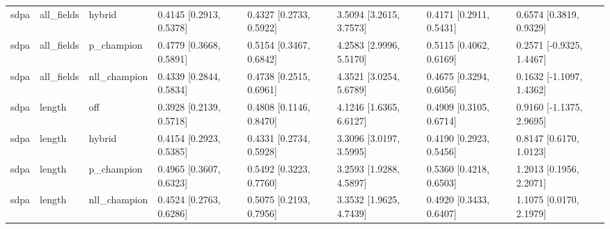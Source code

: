 \begin{tabular}{llllllll}
sdpa & all\_fields & hybrid & 0.4145 [0.2913, 0.5378] & 0.4327 [0.2733, 0.5922] & 3.5094 [3.2615, 3.7573] & 0.4171 [0.2911, 0.5431] & 0.6574 [0.3819, 0.9329] \\
sdpa & all\_fields & p\_champion & 0.4779 [0.3668, 0.5891] & 0.5154 [0.3467, 0.6842] & 4.2583 [2.9996, 5.5170] & 0.5115 [0.4062, 0.6169] & 0.2571 [-0.9325, 1.4467] \\
sdpa & all\_fields & nll\_champion & 0.4339 [0.2844, 0.5834] & 0.4738 [0.2515, 0.6961] & 4.3521 [3.0254, 5.6789] & 0.4675 [0.3294, 0.6056] & 0.1632 [-1.1097, 1.4362] \\
sdpa & length & off & 0.3928 [0.2139, 0.5718] & 0.4808 [0.1146, 0.8470] & 4.1246 [1.6365, 6.6127] & 0.4909 [0.3105, 0.6714] & 0.9160 [-1.1375, 2.9695] \\
sdpa & length & hybrid & 0.4154 [0.2923, 0.5385] & 0.4331 [0.2734, 0.5928] & 3.3096 [3.0197, 3.5995] & 0.4190 [0.2923, 0.5456] & 0.8147 [0.6170, 1.0123] \\
sdpa & length & p\_champion & 0.4965 [0.3607, 0.6323] & 0.5492 [0.3223, 0.7760] & 3.2593 [1.9288, 4.5897] & 0.5360 [0.4218, 0.6503] & 1.2013 [0.1956, 2.2071] \\
sdpa & length & nll\_champion & 0.4524 [0.2763, 0.6286] & 0.5075 [0.2193, 0.7956] & 3.3532 [1.9625, 4.7439] & 0.4920 [0.3433, 0.6407] & 1.1075 [0.0170, 2.1979] \\
\hline
\end{tabular}
